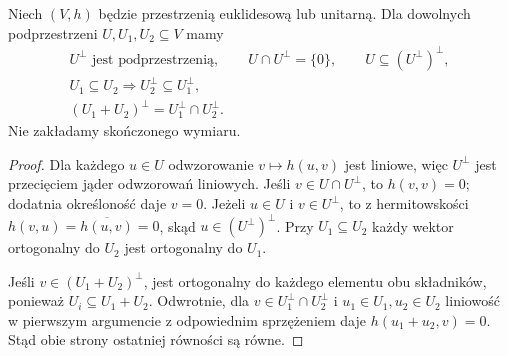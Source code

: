 \begin{stwierdzenie}
\label{prop:lin13-dopelnienia}
Niech \((V,h)\) będzie przestrzenią
euklidesową lub unitarną.
Dla dowolnych podprzestrzeni
\(U,U_1,U_2\subseteq V\) mamy
\[
 \begin{gathered}
 U^\perp\text{ jest podprzestrzenią},\qquad
 U\cap U^\perp=\{0\},\qquad
 U\subseteq (U^\perp)^\perp,\\
 U_1\subseteq U_2\Longrightarrow
     U_2^\perp\subseteq U_1^\perp,\\
 (U_1+U_2)^\perp=U_1^\perp\cap U_2^\perp.
 \end{gathered}
\]
Nie zakładamy skończonego wymiaru.
\end{stwierdzenie}
\begin{proof}
Dla każdego \(u\in U\) odwzorowanie
\(v\mapsto h(u,v)\) jest liniowe,
więc \(U^\perp\) jest przecięciem
jąder odwzorowań liniowych.
Jeśli \(v\in U\cap U^\perp\),
to \(h(v,v)=0\); dodatnia określoność
daje \(v=0\).
Jeżeli \(u\in U\) i \(v\in U^\perp\),
to z hermitowskości
\(h(v,u)=\overline{h(u,v)}=0\),
skąd \(u\in(U^\perp)^\perp\).
Przy \(U_1\subseteq U_2\)
każdy wektor ortogonalny do \(U_2\)
jest ortogonalny do \(U_1\).

Jeśli \(v\in(U_1+U_2)^\perp\),
jest ortogonalny do każdego
elementu obu składników,
ponieważ \(U_i\subseteq U_1+U_2\).
Odwrotnie, dla
\(v\in U_1^\perp\cap U_2^\perp\)
i \(u_1\in U_1,u_2\in U_2\)
liniowość w pierwszym argumencie
z odpowiednim sprzężeniem daje
\(h(u_1+u_2,v)=0\).
Stąd obie strony ostatniej
równości są równe.
\end{proof}

